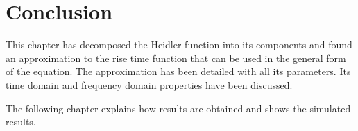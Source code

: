 \section{Conclusion}
\label{sec:approx_conclusion}
This chapter has decomposed the Heidler function into its components and found an approximation to the rise time function that can be used in the general form of the equation. The approximation has been detailed with all its parameters. Its time domain and frequency domain properties have been discussed.

The following chapter explains how results are obtained and shows the simulated results.
